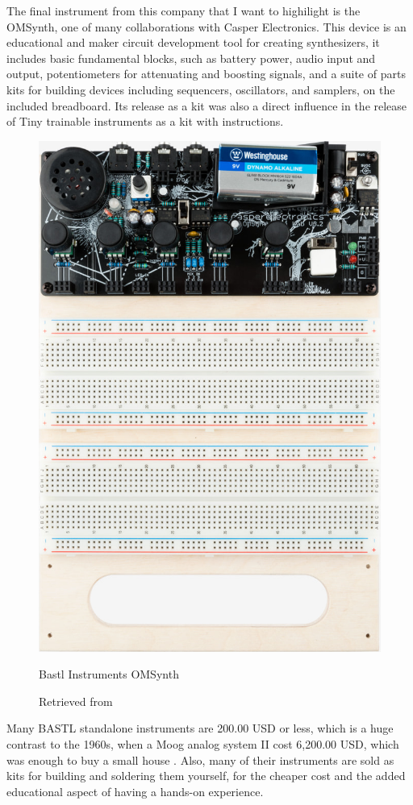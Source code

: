 The final instrument from this company that I want to highilight is the OMSynth, one of many collaborations with Casper Electronics. This device is an educational and maker circuit development tool for creating synthesizers, it includes basic fundamental blocks, such as battery power, audio input and output, potentiometers for attenuating and boosting signals, and a suite of parts kits for building devices including sequencers, oscillators, and samplers, on the included breadboard. Its release as a kit was also a direct influence in the release of Tiny trainable instruments as a kit with instructions.

\begin{figure}[ht]
  \centering
  \includegraphics[width=0.75\linewidth,height=0.25\textheight,keepaspectratio]{images/bastl-omsynth.jpg}
  \caption{Bastl Instruments OMSynth}
  \caption*{Retrieved from \cite{website-bastl-instruments-current}}
  \label{fig:bastl-omsynth}
\end{figure}

Many BASTL standalone instruments are 200.00 USD or less, which is a huge contrast to the 1960s, when a Moog analog system II cost 6,200.00 USD, which was enough to buy a small house \cite{analog-days}. Also, many of their instruments are sold as kits for building and soldering them yourself, for the cheaper cost and the added educational aspect of having a hands-on experience.

